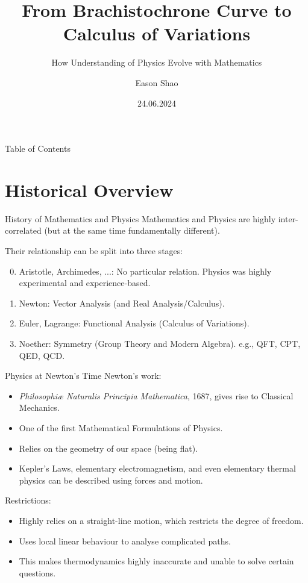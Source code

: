 \documentclass{beamer}
\title[Physics Problem Solving]{From Brachistochrone Curve to Calculus of Variations}
\subtitle{How Understanding of Physics Evolve with Mathematics}
\author{Eason Shao}
\institute[]{Physics Problem Solving Society\\St Paul's School}
\date{24.06.2024}
\begin{document}
\frame{\titlepage}

\begin{frame}{Table of Contents}
    \tableofcontents
\end{frame}

\section{Historical Overview}

\begin{frame}{History of Mathematics and Physics} \pause
    Mathematics and Physics are highly inter-correlated (but at the same time fundamentally different). \pause

    Their relationship can be split into three stages: \pause

    \begin{enumerate}
        \setcounter{enumi}{-1}

        \item Aristotle, Archimedes, ...: No particular relation. Physics was highly experimental and experience-based. \pause
        \item Newton: Vector Analysis (and Real Analysis/Calculus). \pause
        \item Euler, Lagrange: Functional Analysis (Calculus of Variations). \pause
        \item Noether: Symmetry (Group Theory and Modern Algebra). e.g., QFT, CPT, QED, QCD.
    \end{enumerate}
\end{frame}

\begin{frame}{Physics at Newton's Time}
    Newton's work: \pause
    \begin{itemize}
        \item \textit{Philosophiæ Naturalis Principia Mathematica}, 1687, gives rise to Classical Mechanics. \pause
        \item One of the first Mathematical Formulations of Physics. \pause
        \item Relies on the geometry of our space (being flat). \pause
        \item Kepler's Laws, elementary electromagnetism, and even elementary thermal physics can be described using forces and motion. \pause
    \end{itemize}

    Restrictions: \pause
    \begin{itemize}
        \item Highly relies on a straight-line motion, which restricts the degree of freedom. \pause
        \item Uses local linear behaviour to analyse complicated paths. \pause
        \item This makes thermodynamics highly inaccurate and unable to solve certain questions.
    \end{itemize}
\end{frame}
\end{document}
